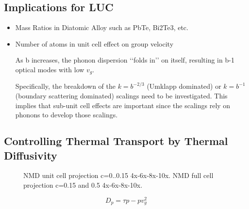 \documentclass[letterpaper,12pt]{article}
\begin{document}
\subsection{\label{S-validation-samples}Implications for LUC}

\begin{itemize}

\item Mass Ratios in Diatomic Alloy such as PbTe, Bi2Te3, etc.

\item Number of atoms in unit cell effect on group velocity

As b increases, the
phonon dispersion ‘‘folds in’’ on itself,
resulting in b-1 optical modes with low
$v_g$.

Specifically, the breakdown of the $k = b^{-2/3}$ (Umklapp dominated) or $k = b^{-1}$ (boundary scattering dominated) scalings need to be investigated. This implies that sub-unit cell effects are important since the scalings rely on phonons to develop those scalings. 

\end{itemize}



\subsection{\label{S-Intro-Dispersion_Disordered}Controlling Thermal Transport by Thermal Diffusivity}


\begin{figure}
\begin{center}
\vspace*{-5mm}
\end{center}
\caption{\label{F:PEAK_COMPARE} NMD unit cell projection c=0..0.15
4x-6x-8x-10x. NMD full cell projection c=0.15 and 0.5  
4x-6x-8x-10x. }
\end{figure}



\begin{equation}\label{EQ:M:l_glass}
D_{p} =  \tau{p-p}v^2_{g}
\end{equation}
\end{document}
